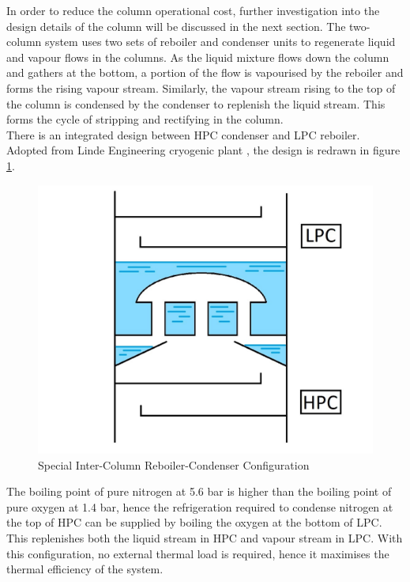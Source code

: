         In order to reduce the column operational cost, further investigation into the design details of the column will be discussed in the next section.
		The two-column system uses two sets of reboiler and condenser units to regenerate liquid and vapour flows in the columns. As the liquid mixture flows down the column and gathers at the bottom, a portion of the flow is vapourised by the reboiler and forms the rising vapour stream. Similarly, the vapour stream rising to the top of the column is condensed by the condenser to replenish the liquid stream. This forms the cycle of stripping and rectifying in the column. \\
		
	    \noindent There is an integrated design between HPC condenser and LPC reboiler. Adopted from Linde Engineering cryogenic plant \citep{linde_cryo}, the design is redrawn in figure \ref{reboiler-condenser_diagram}. \\
		\begin{figure}[H]
		    \centering
		    \includegraphics[scale=0.3]{reboiler-condenser_diagram.jpg}
		    \caption{Special Inter-Column Reboiler-Condenser Configuration}
		    \label{reboiler-condenser_diagram}
		\end{figure}
	    \noindent The boiling point of pure nitrogen at 5.6 bar is higher than the boiling point of pure oxygen at 1.4 bar, hence the refrigeration required to condense nitrogen at the top of HPC can be supplied by boiling the oxygen at the bottom of LPC. This replenishes both the liquid stream in HPC and vapour stream in LPC. With this configuration, no external thermal load is required, hence it maximises the thermal efficiency of the system. \\
